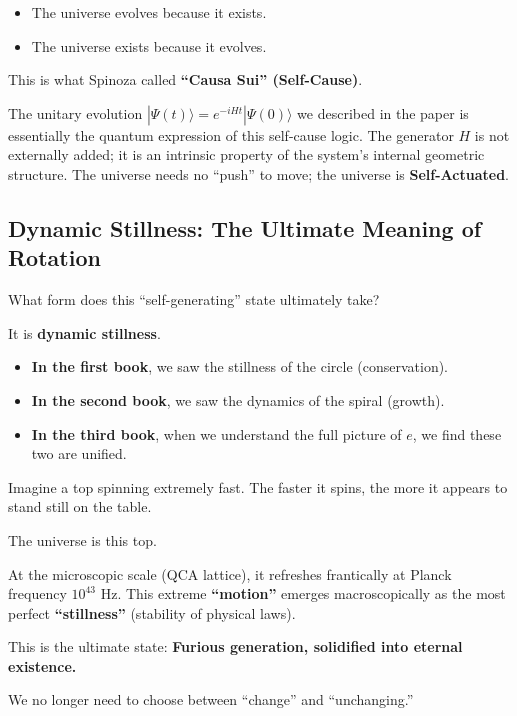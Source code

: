 \begin{itemize}
\item The universe evolves because it exists.

\item The universe exists because it evolves.
\end{itemize}

This is what Spinoza called \textbf{``Causa Sui'' (Self-Cause)}.

The unitary evolution $|\Psi(t)\rangle = e^{-iHt} |\Psi(0)\rangle$ we described in the paper is essentially the quantum expression of this self-cause logic. The generator $H$ is not externally added; it is an intrinsic property of the system's internal geometric structure. The universe needs no ``push'' to move; the universe is \textbf{Self-Actuated}.

\subsection{Dynamic Stillness: The Ultimate Meaning of Rotation}

What form does this ``self-generating'' state ultimately take?

It is \textbf{dynamic stillness}.

\begin{itemize}
\item \textbf{In the first book}, we saw the stillness of the circle (conservation).

\item \textbf{In the second book}, we saw the dynamics of the spiral (growth).

\item \textbf{In the third book}, when we understand the full picture of $e$, we find these two are unified.
\end{itemize}

Imagine a top spinning extremely fast. The faster it spins, the more it appears to stand still on the table.

The universe is this top.

At the microscopic scale (QCA lattice), it refreshes frantically at Planck frequency $10^{43}$ Hz. This extreme \textbf{``motion''} emerges macroscopically as the most perfect \textbf{``stillness''} (stability of physical laws).

This is the ultimate state: \textbf{Furious generation, solidified into eternal existence.}

We no longer need to choose between ``change'' and ``unchanging.''

